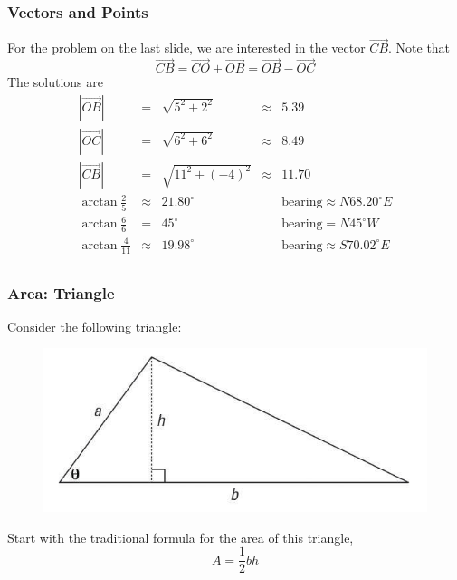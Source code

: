 \documentclass[xcolor=dvipsnames]{beamer}
\begin{document}
\begin{frame}
  \frametitle{Vectors and Points}
For the problem on the last slide, we are interested in the vector
$\vec{CB}$. Note that
\begin{equation}
  \label{eq:iethaozo}
  \vec{CB}=\vec{CO}+\vec{OB}=\vec{OB}-\vec{OC}
\end{equation}
The solutions are
\begin{equation}
  \label{eq:theelihe}
  \begin{array}{rcccl}
    |\vec{OB}| & = & \sqrt{5^{2}+2^{2}} & \approx & 5.39 \\
    |\vec{OC}| & = & \sqrt{6^{2}+6^{2}} & \approx & 8.49 \\
    |\vec{CB}| & = & \sqrt{11^{2}+(-4)^{2}} & \approx & 11.70 \\
    \arctan\frac{2}{5} & \approx & 21.80^{\circ} & & \mbox{bearing}\approx{}N68.20^{\circ}E \\
    \arctan\frac{6}{6} & = & 45^{\circ} & & \mbox{bearing}=N45^{\circ}W \\
    \arctan\frac{4}{11} & \approx & 19.98^{\circ} & & \mbox{bearing}\approx{}S70.02^{\circ}E \\
  \end{array}
\end{equation}
\end{frame}

\begin{frame}
  \frametitle{Area: Triangle}
  Consider the following triangle:
  \begin{figure}[h]
    \includegraphics[scale=.5]{./areatri.png}
  \end{figure}
  Start with the traditional formula for the area of this triangle,
  \begin{equation}
    \label{eq:oquehota}
    A=\frac{1}{2}bh
  \end{equation}
\end{frame}
\end{document}
